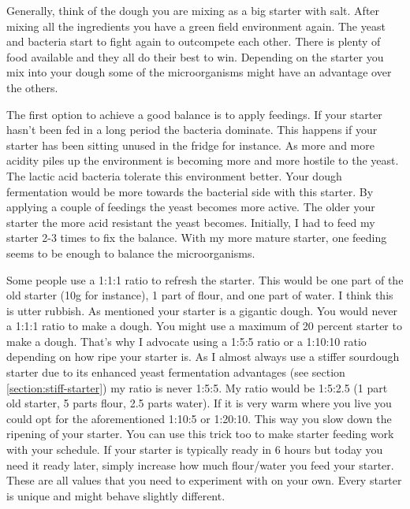 Generally, think of the dough you are mixing as a big starter with salt.
After mixing all the ingredients you have a green field environment again.
The yeast and bacteria start to fight again to outcompete each other.
There is plenty of food available and they all do their best to win.
Depending on the starter you mix into your dough some of the microorganisms
might have an advantage over the others.

The first option to achieve a good balance is to apply feedings.
If your starter hasn't been fed in a long period the
bacteria dominate. This happens if your starter has been
sitting unused in the fridge for instance. As more and more
acidity piles up the environment is becoming more and more hostile
to the yeast. The lactic acid bacteria tolerate this environment
better. Your dough fermentation would be more towards the
bacterial side with this starter. By applying a couple of
feedings the yeast becomes more active. The older your
starter the more acid resistant the yeast becomes. Initially,
I had to feed my starter 2-3 times to fix the balance. With my
more mature starter, one feeding seems to be enough to balance
the microorganisms.

Some people use a 1:1:1 ratio to refresh the starter. This would
be one part of the old starter (10g for instance), 1 part of flour,
and one part of water. I think this is utter rubbish. As mentioned
your starter is a gigantic dough. You would never a 1:1:1 ratio to
make a dough. You might use a maximum of 20 percent starter to
make a dough. That's why I advocate using a 1:5:5 ratio or a
1:10:10 ratio depending on how ripe your starter is. As I almost
always use a stiffer sourdough starter due to its enhanced
yeast fermentation advantages (see section \ref{section:stiff-starter})
my ratio is never 1:5:5. My ratio would be 1:5:2.5 (1 part old starter,
5 parts flour, 2.5 parts water). If it is very warm where you live
you could opt for the aforementioned 1:10:5 or 1:20:10. This
way you slow down the ripening of your starter. You can use this
trick too to make starter feeding work with your schedule.
If your starter is typically ready in 6 hours but today you need it
ready later, simply increase how much flour/water you feed your starter.
These are all values that you need to experiment with on your own.
Every starter is unique and might behave slightly different.

